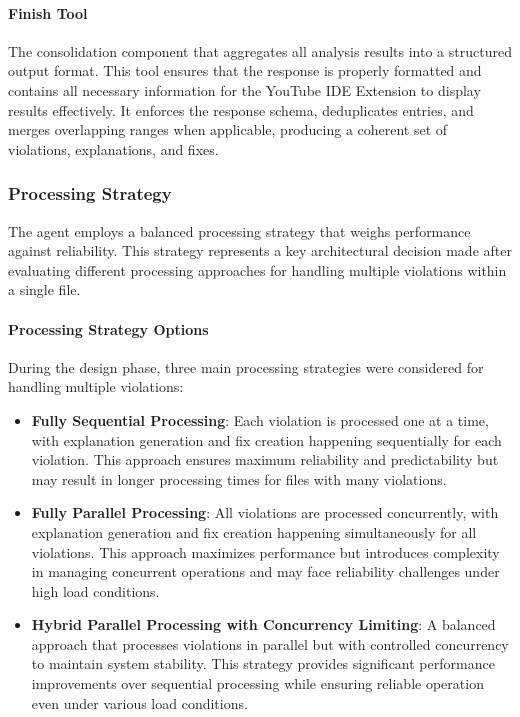 \begin{spacing}{1.2}
\paragraph{Finish Tool}
The consolidation component that aggregates all analysis results into a structured output format. This tool ensures that the response is properly formatted and contains all necessary information for the YouTube IDE Extension to display results effectively. It enforces the response schema, deduplicates entries, and merges overlapping ranges when applicable, producing a coherent set of violations, explanations, and fixes.

\subsubsection{Processing Strategy}
The agent employs a balanced processing strategy that weighs performance against reliability. This strategy represents a key architectural decision made after evaluating different processing approaches for handling multiple violations within a single file.

\paragraph{Processing Strategy Options}
During the design phase, three main processing strategies were considered for handling multiple violations:

\begin{itemize}
    \item \textbf{Fully Sequential Processing}: Each violation is processed one at a time, with explanation generation and fix creation happening sequentially for each violation. This approach ensures maximum reliability and predictability but may result in longer processing times for files with many violations.
    
    \item \textbf{Fully Parallel Processing}: All violations are processed concurrently, with explanation generation and fix creation happening simultaneously for all violations. This approach maximizes performance but introduces complexity in managing concurrent operations and may face reliability challenges under high load conditions.
    
    \item \textbf{Hybrid Parallel Processing with Concurrency Limiting}: A balanced approach that processes violations in parallel but with controlled concurrency to maintain system stability. This strategy provides significant performance improvements over sequential processing while ensuring reliable operation even under various load conditions.
\end{itemize}


\end{spacing}
